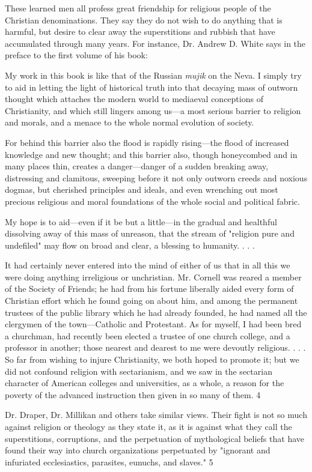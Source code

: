 These learned men all profess great friendship for religious people of the Christian
denominations. They say they do not wish to do anything that is harmful, but desire to clear
away the superstitions and rubbish that have accumulated through many years. For instance,
Dr. Andrew D. White says in the preface to the first volume of his book:

My work in this book is like that of the Russian \textit{mujik} on the Neva. I simply try to aid in
letting the light of historical truth into that decaying mass of outworn thought which attaches
the modern world to mediaeval conceptions of Christianity, and which still lingers among
us—a most serious barrier to religion and morals, and a menace to the whole normal
evolution of society.

For behind this barrier also the flood is rapidly rising—the flood of increased knowledge and
new thought; and this barrier also, though honeycombed and in many places thin, creates a
danger—danger of a sudden breaking away, distressing and clamitous, sweeping before it not
only outworn creeds and noxious dogmas, but cherished principles and ideals, and even
wrenching out most precious religious and moral foundations of the whole social and
political fabric.

My hope is to aid—even if it be but a little—in the gradual and healthful dissolving away of
this mass of unreason, that the stream of "religion pure and undefiled" may flow on broad
and clear, a blessing to humanity. . . .

It had certainly never entered into the mind of either of us that in all this we were doing
anything irreligious or unchristian. Mr. Cornell was reared a member of the Society of
Friends; he had from his fortune liberally aided every form of Christian effort which he
found going on about him, and among the permanent trustees of the public library which he
had already founded, he had named all the clergymen of the town—Catholic and Protestant.
As for myself, I had been bred a churchman, had recently been elected a trustee of one
church college, and a professor in another; those nearest and dearest to me were devoutly
religious. . . . So far from wishing to injure Christianity, we both hoped to promote it; but we
did not confound religion with sectarianism, and we saw in the sectarian character of
American colleges and universities, as a whole, a reason for the poverty of the advanced
instruction then given in so many of them. 4

Dr. Draper, Dr. Millikan and others take similar views. Their fight is not so much against
religion or theology as they state it, as it is against what they call the superstitions,
corruptions, and the perpetuation of mythological beliefs that have found their way into
church organizations perpetuated by "ignorant and infuriated ecclesiastics, parasites,
eunuchs, and slaves." 5

